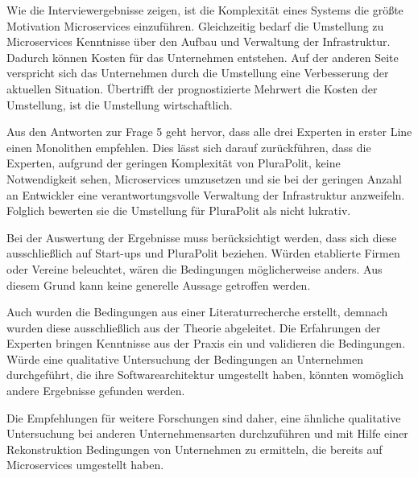 Wie die Interviewergebnisse zeigen, ist die Komplexität eines Systems die größte Motivation Microservices einzuführen. Gleichzeitig bedarf die Umstellung zu Microservices Kenntnisse über den Aufbau und Verwaltung der Infrastruktur. Dadurch können Kosten für das Unternehmen entstehen. Auf der anderen Seite verspricht sich das Unternehmen durch die Umstellung eine Verbesserung der aktuellen Situation. Übertrifft der prognostizierte Mehrwert die Kosten der Umstellung, ist die Umstellung wirtschaftlich.

Aus den Antworten zur Frage 5 geht hervor, dass alle drei Experten in erster Line einen Monolithen empfehlen. Dies lässt sich darauf zurückführen, dass die Experten, aufgrund der geringen Komplexität von PluraPolit, keine Notwendigkeit sehen, Microservices umzusetzen und sie bei der geringen Anzahl an Entwickler eine verantwortungsvolle Verwaltung der Infrastruktur anzweifeln. Folglich bewerten sie die Umstellung für PluraPolit als nicht lukrativ.

Bei der Auswertung der Ergebnisse muss berücksichtigt werden, dass sich diese ausschließlich auf Start-ups und PluraPolit beziehen. Würden etablierte Firmen oder Vereine beleuchtet, wären die Bedingungen möglicherweise anders. Aus diesem Grund kann keine generelle Aussage getroffen werden.

Auch wurden die Bedingungen aus einer Literaturrecherche erstellt, demnach wurden diese ausschließlich aus der Theorie abgeleitet. Die Erfahrungen der Experten bringen Kenntnisse aus der Praxis ein und validieren die Bedingungen. Würde eine qualitative Untersuchung der Bedingungen an Unternehmen durchgeführt, die ihre Softwarearchitektur umgestellt haben, könnten womöglich andere Ergebnisse gefunden werden.

Die Empfehlungen für weitere Forschungen sind daher, eine ähnliche qualitative Untersuchung bei anderen Unternehmensarten durchzuführen und mit Hilfe einer Rekonstruktion Bedingungen von Unternehmen zu ermitteln, die bereits auf Microservices umgestellt haben.
